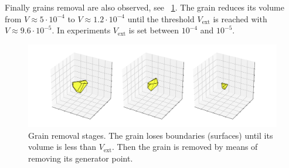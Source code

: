 Finally grains removal are also observed, 
see \figurename~\ref{fig:3Dremoval}. 
The grain reduces its volume from 
$V\approx 5\cdot10^{-4}$ to $V \approx 1.2\cdot10^{-4}$ until the threshold $V_{\text{ext}}$ is reached with $V \approx 9.6\cdot10^{-5}$. 
In experiments $V_{\text{ext}}$ is set between $10^{-4}$ and $10^{-5}$.

\begin{figure}[!t]
    \centering
    \includegraphics[trim={0 2em 0
    2em},scale=0.37]{figures/3d_voronoi/3D_grain_removal.pdf}
    \subfloat[\label{grem1}]{\hspace{.2\linewidth}}
    \subfloat[\label{grem2}]{\hspace{.2\linewidth}}
    \subfloat[\label{grem3}]{\hspace{.2\linewidth}}
    \caption[Three-dimensional grain removal]{Grain removal stages. 
    The grain loses boundaries (surfaces) until its
    volume is less than $V_{\text{ext}}$.
    Then the grain is removed by means of 
    removing its generator point.}
    \label{fig:3Dremoval}
\end{figure}
